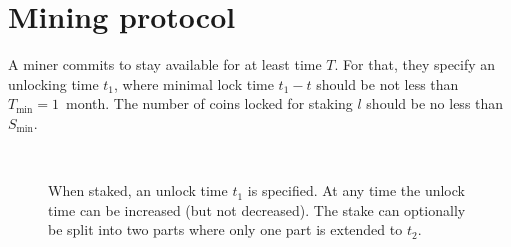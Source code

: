 \documentclass[longbibliography,nofootinbib,twocolumn]{revtex4-1}
\begin{document}
\section{Mining protocol}

A miner commits to stay available for at least time $T$.
For that, they specify an unlocking time $t_1$,
where minimal lock time $t_1 - t$ should be not less than $T_{\min} = 1$~month.
The number of coins locked for staking $l$ should be no less than $S_{\min}$.

\begin{figure}
    \\
    \caption{
        When staked, an unlock time $t_1$ is specified.
        At any time the unlock time can be increased (but not decreased).
        The stake can optionally be split into two parts where only one part is extended to $t_2$.
    }
    \label{fig:mining-modes}
\end{figure}
\end{document}
